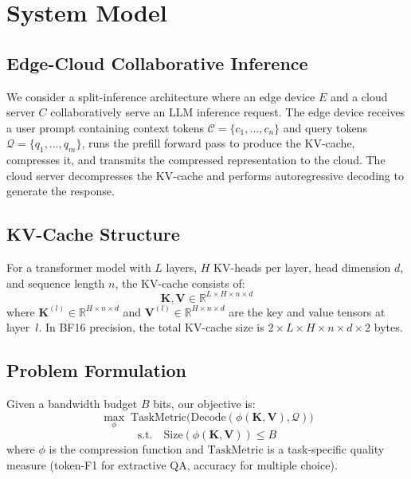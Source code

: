 \documentclass[conference]{IEEEtran}
\newcommand{\R}{\mathbb{R}}
\newcommand{\bK}{\mathbf{K}}
\newcommand{\bV}{\mathbf{V}}
\begin{document}
\section{System Model}
\label{sec:system}

\subsection{Edge-Cloud Collaborative Inference}

We consider a split-inference architecture where an edge device $E$ and a cloud server $C$ collaboratively serve an LLM inference request.
The edge device receives a user prompt containing context tokens $\mathcal{C} = \{c_1, \ldots, c_n\}$ and query tokens $\mathcal{Q} = \{q_1, \ldots, q_m\}$, runs the prefill forward pass to produce the KV-cache, compresses it, and transmits the compressed representation to the cloud.
The cloud server decompresses the KV-cache and performs autoregressive decoding to generate the response.

\subsection{KV-Cache Structure}

For a transformer model with $L$ layers, $H$ KV-heads per layer, head dimension $d$, and sequence length $n$, the KV-cache consists of:
\begin{equation}
    \bK, \bV \in \R^{L \times H \times n \times d}
\end{equation}
where $\bK^{(l)} \in \R^{H \times n \times d}$ and $\bV^{(l)} \in \R^{H \times n \times d}$ are the key and value tensors at layer~$l$.
In BF16 precision, the total KV-cache size is $2 \times L \times H \times n \times d \times 2$ bytes.

\subsection{Problem Formulation}

Given a bandwidth budget $B$ bits, our objective is:
\begin{equation}
    \max_{\phi} \; \text{TaskMetric}\big(\text{Decode}(\phi(\bK, \bV), \mathcal{Q})\big)
    \label{eq:objective}
\end{equation}
\vspace{-2mm}
\begin{equation}
    \text{s.t.} \quad \text{Size}(\phi(\bK, \bV)) \leq B
\end{equation}
where $\phi$ is the compression function and $\text{TaskMetric}$ is a task-specific quality measure (token-F1 for extractive QA, accuracy for multiple choice).
\end{document}
